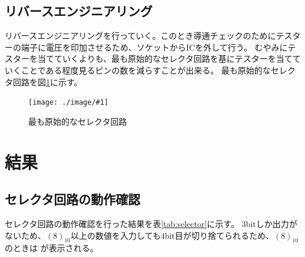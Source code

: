 \documentclass[a4paper,11pt]{ltjsarticle}
\newcommand{\fig}[4]{
    \begin{figure}[htbp]
      \centering
      \texttt{[image: ./image/\#1]}
      \caption{#2}
      \label{fig:#3}
    \end{figure}
  }
\begin{document}
\subsection{リバースエンジニアリング}
リバースエンジニアリングを行っていく。このとき導通チェックのためにテスターの端子に電圧を印加させるため、ソケットからICを外して行う。
むやみにテスターを当てていくよりも、最も原始的なセレクタ回路を基にテスターを当てていくことである程度見るピンの数を減らすことが出来る。
最も原始的なセレクタ回路を図\ref{fig:selector}に示す。
\fig{selector.png}{最も原始的なセレクタ回路}{selector}{1}
\section{結果}
\subsection{セレクタ回路の動作確認}
セレクタ回路の動作確認を行った結果を表\ref{tab:selector}に示す。
3bitしか出力がないため、$(8)_10$以上の数値を入力しても4bit目が切り捨てられるため、$(8)_10$のときは 
 が表示される。
\end{document}
